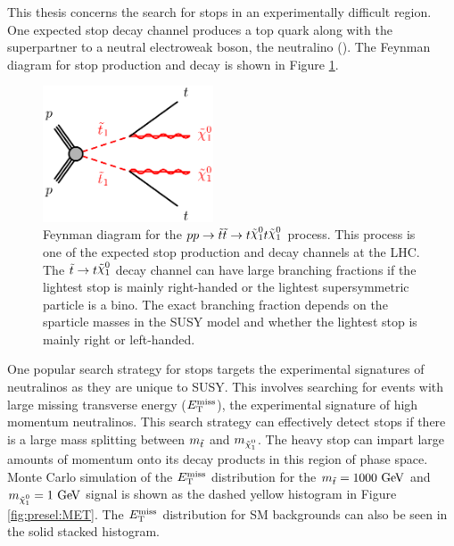 \indent This thesis concerns the search for stops in an experimentally difficult region.  One expected stop decay channel produces a top quark along with the superpartner to a neutral electroweak boson, the neutralino (\ninoone).  The Feynman diagram for stop production and decay is shown in Figure \ref{fig:stopprod}. \\

\begin{figure}[h!]
\centering
    \includegraphics[width=0.45\textwidth]{figures/feynDiag/stst-tN1tN1.png}\hspace{0.05\textwidth}
\caption[Feynman diagram for the production and decay of stops at the LHC]{ Feynman diagram for the $pp \rightarrow \stop\stop \rightarrow t\ninoone t\ninoone$ process.  This process is one of the expected stop production and decay channels at the LHC.  The $\stop \rightarrow t\ninoone$ decay channel can have large branching fractions if the lightest stop is mainly right-handed or the lightest supersymmetric particle is a bino. The exact branching fraction depends on the sparticle masses in the SUSY model and whether the lightest stop is mainly right or left-handed. }
\label{fig:stopprod}
\end{figure}

\indent One popular search strategy for stops targets the experimental signatures of neutralinos as they are unique to SUSY.  This involves searching for events with large missing transverse energy ($E_{\mathrm{T}}^{\mathrm{miss}}$), the experimental signature of high momentum neutralinos.  This search strategy can effectively detect stops if there is a large mass splitting between $m_{\tilde{t}}$ and $m_{\ninoone}$. The heavy stop can impart large amounts of momentum onto its decay products in this region of phase space.  Monte Carlo simulation of the $E_{\mathrm{T}}^{\mathrm{miss}}$ distribution for the $m_{\stop} = 1000 \gev$ and $m_{\ninoone} = 1 \gev$ signal is shown as the dashed yellow histogram in Figure \ref{fig:presel:MET}.  The $E_{\mathrm{T}}^{\mathrm{miss}}$ distribution for SM backgrounds can also be seen in the solid stacked histogram.  \\

